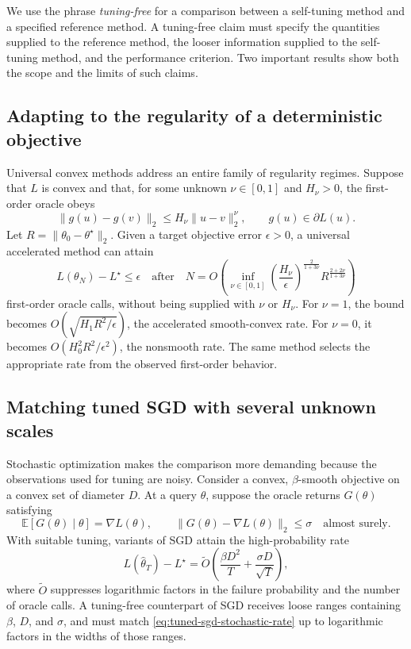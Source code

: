 \documentclass[11pt,twoside]{article}
\newcommand{\E}{\mathbb E}
\theoremstyle{definition}
\theoremstyle{remark}
\begin{document}
We use the phrase \emph{tuning-free} for a comparison between a self-tuning
method and a specified reference method. A tuning-free claim must specify the
quantities supplied to the reference method, the looser information supplied
to the self-tuning method, and the performance criterion. Two important
results show both the scope and the limits of such claims.

\subsection{Adapting to the regularity of a deterministic objective}

Universal convex methods address an entire family of regularity regimes.
Suppose that $L$ is convex and that, for some unknown $\nu\in[0,1]$ and
$H_\nu>0$, the first-order oracle obeys
\begin{equation}
 \|g(u)-g(v)\|_2
 \le H_\nu\|u-v\|_2^\nu,
 \qquad g(u)\in\partial L(u).
 \label{eq:holder-first-order-oracle}
\end{equation}
Let $R=\|\theta_0-\theta^\star\|_2$. Given a target objective error
$\epsilon>0$, a universal accelerated method can attain
\begin{equation}
 L(\theta_N)-L^\star\le\epsilon
 \quad\text{after}\quad
 N=O\left(
   \inf_{\nu\in[0,1]}
   \left(\frac{H_\nu}{\epsilon}\right)^{\frac{2}{1+3\nu}}
   R^{\frac{2+2\nu}{1+3\nu}}
 \right)
 \label{eq:universal-convex-complexity}
\end{equation}
first-order oracle calls, without being supplied with $\nu$ or $H_\nu$.
For $\nu=1$, the bound becomes
$O(\sqrt{H_1R^2/\epsilon})$, the accelerated smooth-convex rate. For
$\nu=0$, it becomes $O(H_0^2R^2/\epsilon^2)$, the nonsmooth rate. The same
method selects the appropriate rate from the observed first-order behavior.

\subsection{Matching tuned SGD with several unknown scales}

Stochastic optimization makes the comparison more demanding because the
observations used for tuning are noisy. Consider a convex,
$\beta$-smooth objective on a convex set of diameter $D$. At a query
$\theta$, suppose the oracle returns $G(\theta)$ satisfying
\begin{equation}
 \E[G(\theta)\mid\theta]=\nabla L(\theta),
 \qquad
 \|G(\theta)-\nabla L(\theta)\|_2\le\sigma
 \quad\text{almost surely}.
 \label{eq:tuning-free-oracle}
\end{equation}
With suitable tuning, variants of SGD attain the high-probability rate
\begin{equation}
 L(\widehat\theta_T)-L^\star
 =\widetilde O\left(
    \frac{\beta D^2}{T}+\frac{\sigma D}{\sqrt T}
  \right),
 \label{eq:tuned-sgd-stochastic-rate}
\end{equation}
where $\widetilde O$ suppresses logarithmic factors in the failure probability
and the number of oracle calls. A tuning-free counterpart of SGD receives
loose ranges containing $\beta$, $D$, and $\sigma$, and must match
\cref{eq:tuned-sgd-stochastic-rate} up to logarithmic factors in the widths of
those ranges.
\end{document}
